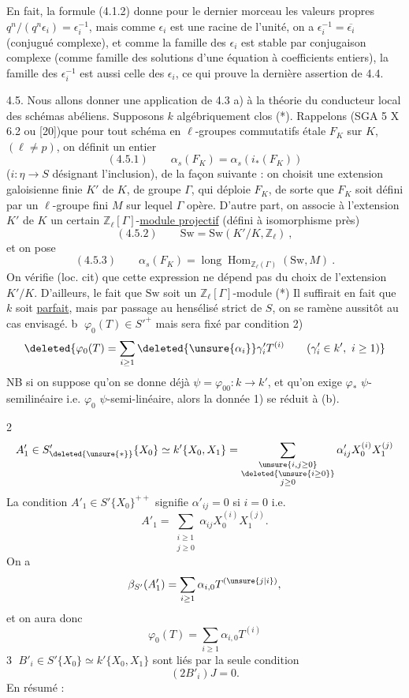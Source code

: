 En fait, la formule (4.1.2) donne pour le dernier morceau les valeurs propres $q^n/(q^n\epsilon_i)=\epsilon_i^{-1}$, mais comme $\epsilon_i$ est une racine de l'unité, on a $\epsilon_i^{-1}=\overline{\epsilon_i}$ (conjugué complexe), et comme la famille des $\epsilon_i$ est stable par conjugaison complexe (comme famille des solutions d'une équation à coefficients entiers), la famille des $\epsilon_i^{-1}$ est aussi celle des $\epsilon_i$, ce qui prouve la dernière assertion de 4.4.

4.5. Nous allons donner une application de 4.3 a) à la théorie du conducteur local des schémas abéliens. Supposons $k$ algébriquement clos (*). Rappelons (SGA 5 X 6.2 ou [20])que pour tout schéma en $\ell$-groupes commutatifs étale $F_K$ sur $K$, $(\ell\ne p)$, on définit un entier
\[
 (4.5.1)\qquad\alpha_s(F_K)=\alpha_s(i_*(F_K))
\]
($i:\eta\longrightarrow S$ désignant l'inclusion), de la façon suivante : on choisit une extension galoisienne finie $K'$ de $K$, de groupe $\Gamma$, qui déploie $F_K$, de sorte que $F_K$ soit défini par un $\ell$-groupe fini $M$ sur lequel $\Gamma$ opère.
D'autre part, on associe à l'extension $K'$ de $K$ un certain $\mathbb Z_\ell[\Gamma]$-\uline{module projectif} (défini à isomorphisme près)
\[
 (4.5.2)\qquad\mathrm{Sw}=\mathrm{Sw}(K'/K,\mathbb Z_\ell)\ ,
\]
et on pose
\[
 (4.5.3)\qquad\alpha_s(F_K)=\operatorname{long}\operatorname{Hom}_{\mathbb Z_\ell(\Gamma)}(\mathrm{Sw},M)\ .
\]
On vérifie (loc. cit) que cette expression ne dépend pas du choix de l'extension $K'/K$. D'ailleurs, le fait que $\mathrm{Sw}$ soit un $\mathbb Z_\ell[\Gamma]$-module
(*) Il suffirait en fait que $k$ soit \uline{parfait}, mais par passage au hensélisé strict de $S$, on se ramène aussitôt au cas envisagé.
\textcircled{b} $\varphi_0(T)\in S'^+$  mais sera fixé par condition 2)
\[
 \deleted{\varphi_0(T)=\sum_{i\geq1}\deleted{\unsure{\alpha_i}}\gamma'_iT^{(i)}\qquad(\gamma'_i\in k',\ i\geq1)}
\]
 NB si on suppose qu'on se donne déjà $\psi=\varphi_{00}:k\longrightarrow k'$, et qu'on exige $\varphi_*$ $\psi$-semilinéaire i.e. $\varphi_0$ $\psi$-semi-linéaire, alors la donnée 1) se réduit à (b).

\textcircled{2}
\[
 A'_1\in S'_{\deleted{\unsure{*}}}\{X_0\}\simeq k'\{X_0,X_1\}
 =\sum_{\substack{\unsure{i,j\geq0}\\\deleted{\unsure{i\geq0}}\\j\geq0}}\alpha'_{ij}X_0^{(i)}X_1^{(j)}
\]
La condition $A'_1\in S'\{X_0\}^{++}$ signifie $\alpha'_{ij}=0$ si $i=0$
i.e.
\[
 A'_1=\sum_{\substack{i\geq1\\j\geq0}}\alpha_{ij}X_0^{(i)}X_1^{(j)}.
\]
On a
\[
 \beta_{S'}(A'_1)=\sum_{i\geq1}\alpha_{i,0}T^{(\unsure{j|i})},
\]
et on aura donc
\[
 \varphi_0(T)=\sum_{i\geq1}\alpha_{i,0}T^{(i)}
\]
\textcircled{3} $B'_i\in S'\{X_0\}\simeq k'\{X_0,X_1\}$ sont liés par la seule condition
\[
 (2B'_i)J=0.
\]
En résumé :

